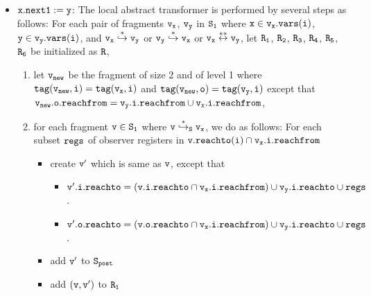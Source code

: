 \begin{itemize}
\item  ${\tt x.next1:= y}$: The local abstract transformer is performed by several steps as follows: For each pair of fragments $\tt v_x$, $\tt v_y$ in $\tt S_1$ where $\tt x \in v_x.{\tt vars}(\tt i)$, $\tt y \in v_y.{\tt vars}(\tt i)$, and $\tt v_x \overset{*}\hookrightarrow v_y$ or $\tt v_y \overset{*}\hookrightarrow v_x$ or $\tt v_x \overset{**}\leftrightarrow v_y$, let $\tt R_1$, $\tt R_2$, $\tt R_3$, $\tt R_4$, $\tt R_5$, $\tt R_6$ be initialized as $\tt R$,  
\begin{enumerate}
\item let $\tt v_{new}$ be the fragment of size 2 and of level 1 where $\tt tag(v_{new},i) = tag(v_x, i)$ and $\tt tag(v_{new},o) = tag(v_y,i)$ except that $\tt v_{new}.o.reachfrom = v_y.i.reachfrom \cup v_x.i.reachfrom$,
\item  for each fragment $\tt v \in S_1$ where $\tt v \overset{*}\hookrightarrow_S v_x$, we do as follows: For each subset $\tt regs$ of observer registers in $\tt v.reachto(\tt i) \cap \tt v_x.i.reachfrom$


\begin{itemize}
\item create $\tt v'$ which is same as $\tt v$, except that
\begin{itemize}
\item $\tt v'.i.reachto = (\tt v.i.reachto \cap v_x.i.reachfrom) \cup v_y.i.reachto \cup regs$.
\item $\tt v'.o.reachto = (\tt v.o.reachto \cap v_x.i.reachfrom) \cup v_y.i.reachto \cup regs$.
\end{itemize}
\item add $\tt v'$ to $\tt S_{post}$ 
\item add $\tt (v,v')$ to $\tt R_1$
\end{itemize}


\end{enumerate}
\end{itemize}
